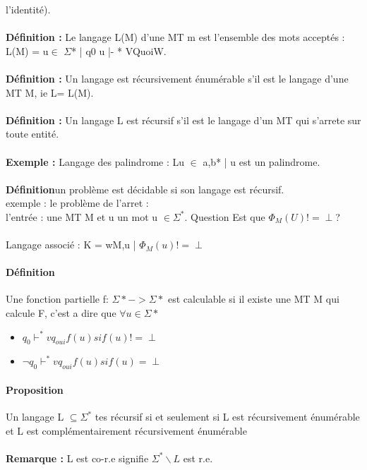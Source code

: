 \documentclass{article}
\begin{document}
l'identité).\\\\\textbf{Définition : }Le langage L(M) d'une MT m est l'ensemble des mots acceptés : L(M) = {u$\in$ $\Sigma$* | q0 u |- * VQuoiW}.\\\\\textbf{Définition : } Un langage est récursivement énumérable s'il est le langage d'une MT M, ie L= L(M).\\\\\textbf{Définition : } Un langage L est récursif s'il est le langage d'un MT qui s'arrete sur toute entité.\\\\\textbf{Exemple : } Langage des palindrome : L{u $\in$ {a,b}* | u est un palindrome}.\\\\ \textbf{Définition}un problème est décidable si son langage est récursif.\\exemple : le problème de l'arret :\\ l'entrée : une MT M et u un mot u $\in \Sigma^{*}$. Question Est que $\Phi_{M}(U) != \perp$?\\\\Langage associé : K = {wM,u | $\Phi_{M}(u) != \perp$}
\paragraph{Définition}
Une fonction partielle f: $\Sigma* -> \Sigma*$ est calculable si il existe une MT M qui calcule F, c'est a dire que $\forall u \in \Sigma*$ \begin{itemize}
\item $q_{0} \vdash^{*} vq_{oui}f(u) si f(u) != \perp$
\item $\neg q_{0} \vdash^{*} vq_{oui}f(u) si f(u) = \perp$
\end{itemize}
\paragraph{Proposition}
Un langage L $\subseteq \Sigma^{*}$ tes récursif si et seulement si L est récursivement énumérable et L est complémentairement récursivement énumérable \\\\\textbf{Remarque : }L est co-r.e signifie $\Sigma^{*}\backslash L$ est r.e.
\end{document}
